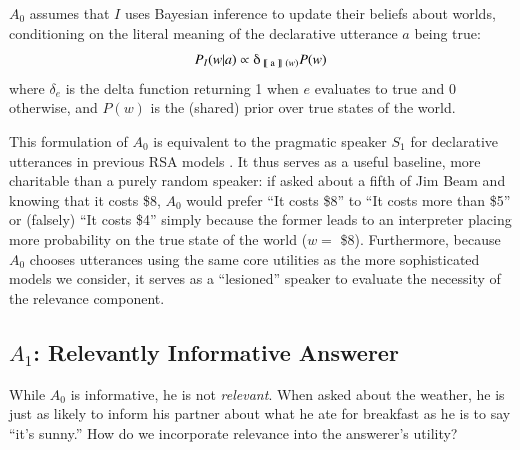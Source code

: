 \documentclass[11pt, floatsintext]{apa6}
\newcommand{\den}[2][]{
\(
\left\llbracket\;\text{#2}\;\right\rrbracket^{#1}
\)
}
\begin{document}
$A_0$ assumes that $I$ uses Bayesian inference to update their beliefs about worlds, conditioning on the literal meaning of the declarative utterance $a$ being true:
$$P_I(w|a) \propto \delta_{\textrm{\den{a}}(w)} P(w)$$
where $\delta_{e}$ is the delta function returning 1 when $e$ evaluates to true and 0 otherwise, and $P(w)$ is the (shared) prior over true states of the world. 

This formulation of $A_0$ is equivalent to the pragmatic speaker $S_1$ for declarative utterances in previous RSA models \cite{GoodmanFrank16_RSATiCS}. 
It thus serves as a useful baseline, more charitable than a purely random speaker: if asked about a fifth of Jim Beam and knowing that it costs \$8, $A_0$ would prefer ``It costs \$8'' to ``It costs more than \$5'' or (falsely) ``It costs \$4'' simply because the former leads to an interpreter placing more probability on the true state of the world ($w = $ \$8).
Furthermore, because $A_0$ chooses utterances using the same core utilities as the more sophisticated models we consider, it serves as a ``lesioned'' speaker to evaluate the necessity of the relevance component. 



\subsection{$A_1$: Relevantly Informative Answerer}

While $A_0$ is informative, he is not \emph{relevant}. When asked about the weather, he is just as likely to inform his partner about what he ate for breakfast as he is to say ``it's sunny.'' How do we incorporate relevance into the answerer's utility? 
\end{document}
